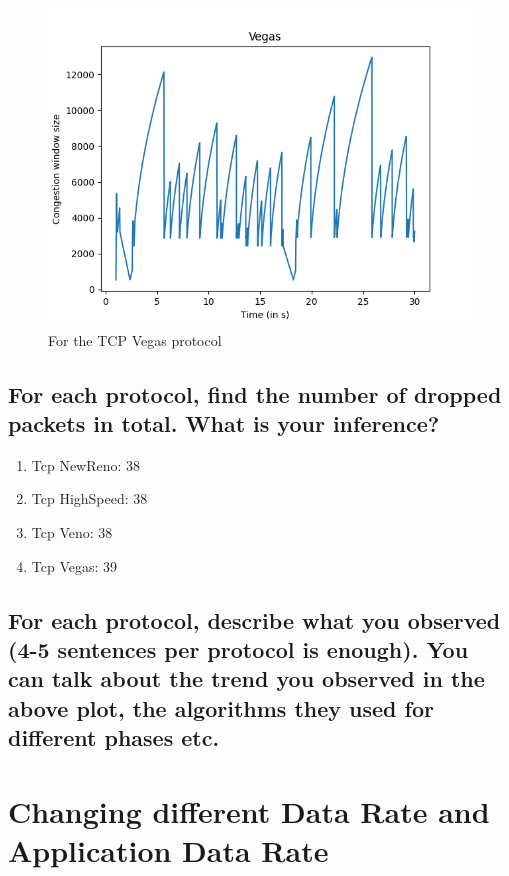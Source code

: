 \documentclass{article}
\begin{document}
\begin{figure}[H]
    \centering
    \includegraphics[scale = 0.8]{Q1/outputs/plots/Vegas.png}
    \caption{For the TCP Vegas protocol}
\end{figure}


\subsection{For each protocol, find the number of dropped packets in total. What is your
inference?}
\begin{enumerate}
    \item Tcp NewReno: 38 
    \item Tcp HighSpeed: 38
    \item Tcp Veno: 38
    \item Tcp Vegas: 39
\end{enumerate}



\subsection{For each protocol, describe what you observed (4-5 sentences per protocol is
enough). You can talk about the trend you observed in the above plot, the algorithms
they used for different phases etc.}


\section{Changing different Data Rate and Application Data Rate}
\end{document}
